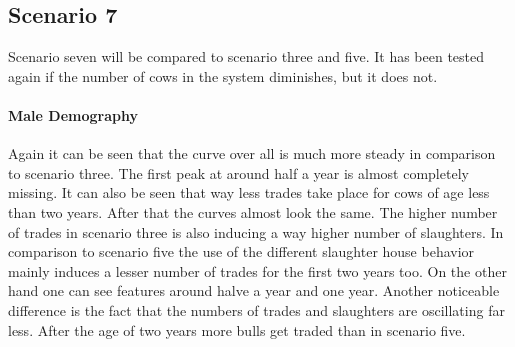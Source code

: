 \subsection{Scenario 7}
Scenario seven will be compared to scenario three and five. It has been tested again if the number of cows in the system diminishes, but it does not.
\paragraph{Male Demography}
Again it can be seen that the curve over all is much more steady in comparison to scenario three. The first peak at around half a year is almost completely missing. It can also be seen that way less trades take place for cows of age less than two years. After that the curves almost look the same. The higher number of trades in scenario three is also inducing a way higher number of slaughters.
In comparison to scenario five the use of the different slaughter house behavior mainly induces a lesser number of trades for the first two years too. On the other hand one can see features around halve a year and one year. Another noticeable difference is the fact that the numbers of trades and slaughters are oscillating far less. After the age of two years more bulls get traded than in scenario five. 
